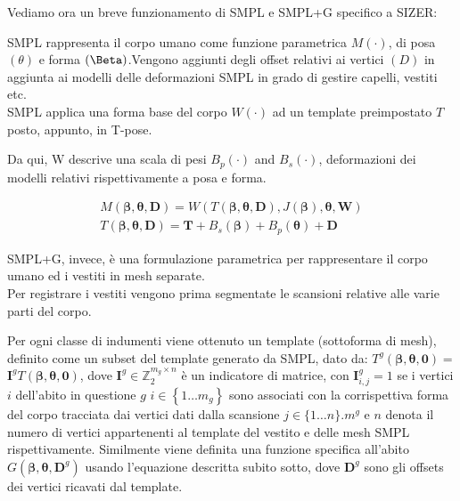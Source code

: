 \medskip

Vediamo ora un breve funzionamento di SMPL e SMPL+G specifico a SIZER:

\medskip

SMPL rappresenta il corpo umano come funzione parametrica $M(\cdot)$, di posa $(\theta)$ e forma $(\Beta)$.Vengono aggiunti degli offset relativi ai vertici $(D)$ in aggiunta ai modelli delle deformazioni SMPL in grado di gestire capelli, vestiti etc.\\
SMPL applica una forma base del corpo $W(\cdot)$ ad un template preimpostato $T$ posto, appunto, in T-pose.

\medskip

Da qui, W descrive una scala di pesi $B_{p}(\cdot)$ and $B_{s}(\cdot)$, deformazioni dei modelli relativi rispettivamente a posa e forma.

\medskip

\begin{equation*}
\begin{gathered}
M(\boldsymbol{\beta}, \boldsymbol{\theta}, \mathbf{D})=W(T(\boldsymbol{\beta}, \boldsymbol{\theta}, \mathbf{D}), J(\boldsymbol{\beta}), \boldsymbol{\theta}, \mathbf{W}) \\
T(\boldsymbol{\beta}, \boldsymbol{\theta}, \mathbf{D})=\mathbf{T}+B_{s}(\boldsymbol{\beta})+B_{p}(\boldsymbol{\theta})+\mathbf{D}
\end{gathered}
\end{equation*}

\medskip

SMPL+G, invece, è una formulazione parametrica per rappresentare il corpo umano ed i vestiti in mesh separate.\\
Per registrare i vestiti vengono prima segmentate le scansioni relative alle varie parti del corpo.

\medskip

Per ogni classe di indumenti viene ottenuto un template (sottoforma di mesh), definito come un subset del template generato da SMPL, dato da: $T^{g}(\boldsymbol{\beta}, \boldsymbol{\theta}, \boldsymbol{0})=$ $\mathbf{I}^{g} T(\boldsymbol{\beta}, \boldsymbol{\theta}, \mathbf{0})$, dove $\mathbf{I}^{g} \in \mathbb{Z}_{2}^{m_{g} \times n}$ è un indicatore di matrice, con $\mathbf{I}_{i, j}^{g}=1$ se i vertici $i$ dell'abito in questione $g$ $i \in\left\{1 \ldots m_{g}\right\}$ sono associati con la corrispettiva forma del corpo tracciata dai vertici dati dalla scansione $j \in\{1 \ldots n\} . m^{g}$ e $n$ denota il numero di vertici appartenenti al template del vestito e delle mesh SMPL rispettivamente. Similmente viene definita una funzione specifica all'abito $G\left(\boldsymbol{\beta}, \boldsymbol{\theta}, \mathbf{D}^{g}\right)$ usando l'equazione descritta subito sotto, dove $\mathbf{D}^{g}$ sono gli offsets dei vertici ricavati dal template.

